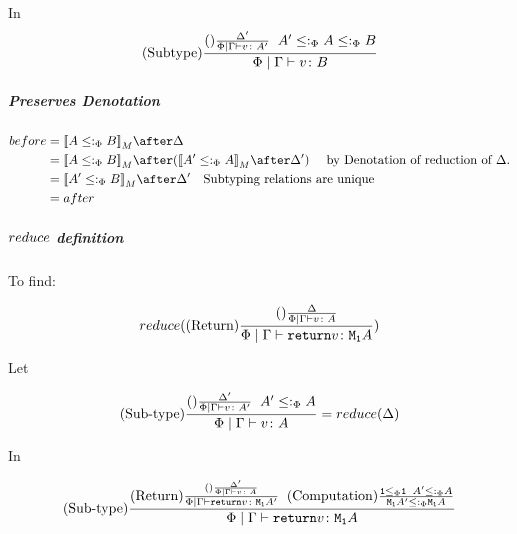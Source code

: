 \documentclass{report}
\begin{document}
            In 
            \begin{equation}
                (\text{Subtype}) \frac{
                    (\text{}) \frac{\Delta'}{\Phi\mid\Gamma \vdash v \colon A'}
                \;\;
                A' \leq:_\Phi A \leq:_\Phi B
                }{\Phi\mid\Gamma \vdash v \colon B}
            \end{equation}

            \subparagraph{Preserves Denotation}
                \begin{align}
                    before & = \deno{A \subtypep B} \after \D \\
                    & = \deno{A \subtypep B} \after (\deno{A' \subtypep A} \after \D') \qt{ by Denotation of reduction of $\D$.}\\
                    & = \deno{A' \subtypep B} \after \D'\qt{Subtyping relations are unique} \\
                    & = after \\
                \end{align}
            \subparagraph{$reduce$ definition}
            To find:
            
                \begin{equation}
                    reduce((\text{Return}) \frac{
                        (\text{}) \frac{\Delta}{\Phi\mid\Gamma \vdash v \colon A}
                    }{\Phi\mid\Gamma \vdash \texttt{return} v \colon \texttt{M}_{\texttt{1}}{A}})
                \end{equation}

                Let 

                \begin{equation}
                    (\text{Sub-type}) \frac{
                        (\text{}) \frac{\Delta'}{\Phi\mid\Gamma \vdash v \colon A'}
                        \;\;
                        A' \leq:_\Phi A
                    }{
                        \Phi\mid\Gamma \vdash v \colon A
                    } = reduce(\Delta)
                \end{equation}

                In

                \begin{equation}
                    (\text{Sub-type}) \frac{
                        (\text{Return}) \frac{
                            (\text{}) \frac{
                            \Delta'
                        }{
                            \Phi\mid\Gamma \vdash v \colon A
                        }}{\Phi\mid\Gamma \vdash \texttt{return} v \colon \texttt{M}_{\texttt{1}}{A'}}
                        \;\;
                        (\text{Computation}) \frac{ \texttt{1}\leq_{\Phi} \texttt{1}\;\; A' \leq:_\Phi A }{\texttt{M}_{\texttt{1}}{ A' }\leq:_\Phi\texttt{M}_{\texttt{1}}{A}}
                    }{
                        \Phi\mid\Gamma \vdash \texttt{return} v \colon \texttt{M}_{\texttt{1}}{A}
                    }
                \end{equation}
\end{document}
